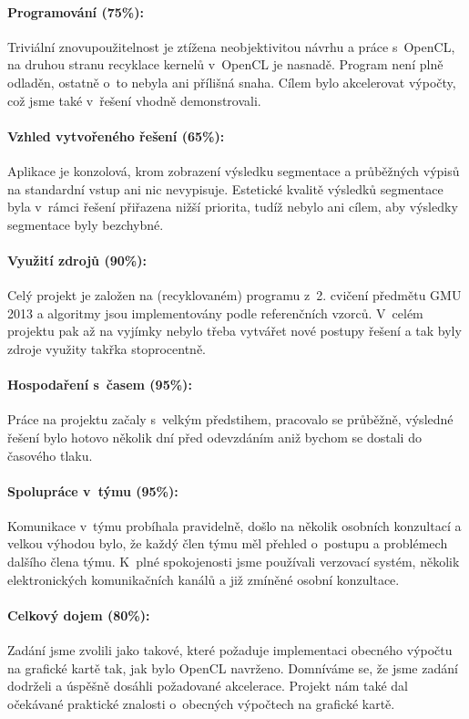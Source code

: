 \documentclass[11pt,a4paper]{article}
\begin{document}
\paragraph{Programování (75\%):}
Triviální znovupoužitelnost je ztížena neobjektivitou návrhu a práce s~OpenCL, na druhou stranu recyklace kernelů v~OpenCL je nasnadě. Program není plně odladěn, ostatně o~to nebyla ani přílišná snaha. Cílem bylo akcelerovat výpočty, což jsme také v~řešení vhodně demonstrovali.

\paragraph{Vzhled vytvořeného řešení (65\%):}
Aplikace je konzolová, krom zobrazení výsledku segmentace a průběžných výpisů na standardní vstup ani nic nevypisuje. Estetické kvalitě výsledků segmentace byla v~rámci řešení přiřazena nižší priorita, tudíž nebylo ani cílem, aby výsledky segmentace byly bezchybné.

\paragraph{Využití zdrojů (90\%):}
Celý projekt je založen na (recyklovaném) programu z~2. cvičení předmětu GMU 2013 a algoritmy jsou implementovány podle referenčních vzorců. V~celém projektu pak až na vyjímky nebylo třeba vytvářet nové postupy řešení a tak byly zdroje využity takřka stoprocentně.

\paragraph{Hospodaření s~časem (95\%):}
Práce na projektu začaly s~velkým předstihem, pracovalo se průběžně, výsledné řešení bylo hotovo několik dní před odevzdáním aniž bychom se dostali do časového tlaku.

\paragraph{Spolupráce v~týmu (95\%):}
Komunikace v~týmu probíhala pravidelně, došlo na několik osobních konzultací a velkou výhodou bylo, že každý člen týmu měl přehled o~postupu a problémech dalšího člena týmu. K~plné spokojenosti jsme používali verzovací systém, několik elektronických komunikačních kanálů a již zmíněné osobní konzultace.

\paragraph{Celkový dojem (80\%):}
Zadání jsme zvolili jako takové, které požaduje implementaci obecného výpočtu na grafické kartě tak, jak bylo OpenCL navrženo. Domníváme se, že jsme zadání dodrželi a úspěšně dosáhli požadované akcelerace. Projekt nám také dal očekávané praktické znalosti o~obecných výpočtech na grafické kartě.
\end{document}
